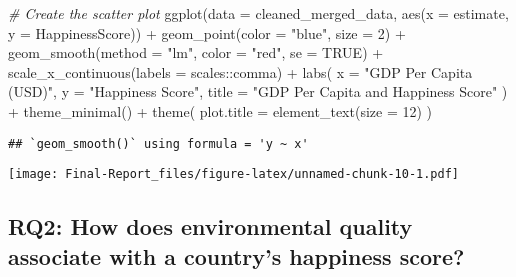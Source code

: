 \documentclass[
]{article}
\newenvironment{Shaded}{\begin{snugshade}}{\end{snugshade}}
\newcommand{\AttributeTok}[1]{\textcolor[rgb]{0.77,0.63,0.00}{#1}}
\newcommand{\CommentTok}[1]{\textcolor[rgb]{0.56,0.35,0.01}{\textit{#1}}}
\newcommand{\ConstantTok}[1]{\textcolor[rgb]{0.00,0.00,0.00}{#1}}
\newcommand{\DecValTok}[1]{\textcolor[rgb]{0.00,0.00,0.81}{#1}}
\newcommand{\FunctionTok}[1]{\textcolor[rgb]{0.00,0.00,0.00}{#1}}
\newcommand{\NormalTok}[1]{#1}
\newcommand{\SpecialCharTok}[1]{\textcolor[rgb]{0.00,0.00,0.00}{#1}}
\newcommand{\StringTok}[1]{\textcolor[rgb]{0.31,0.60,0.02}{#1}}
\begin{document}
\begin{Shaded}
\begin{Highlighting}[]
\CommentTok{\# Create the scatter plot}
\FunctionTok{ggplot}\NormalTok{(}\AttributeTok{data =}\NormalTok{ cleaned\_merged\_data, }\FunctionTok{aes}\NormalTok{(}\AttributeTok{x =}\NormalTok{ estimate, }\AttributeTok{y =}\NormalTok{ HappinessScore)) }\SpecialCharTok{+}
    \FunctionTok{geom\_point}\NormalTok{(}\AttributeTok{color =} \StringTok{"blue"}\NormalTok{, }\AttributeTok{size =} \DecValTok{2}\NormalTok{) }\SpecialCharTok{+}                
    \FunctionTok{geom\_smooth}\NormalTok{(}\AttributeTok{method =} \StringTok{"lm"}\NormalTok{, }\AttributeTok{color =} \StringTok{"red"}\NormalTok{, }\AttributeTok{se =} \ConstantTok{TRUE}\NormalTok{) }\SpecialCharTok{+} 
    \FunctionTok{scale\_x\_continuous}\NormalTok{(}\AttributeTok{labels =}\NormalTok{ scales}\SpecialCharTok{::}\NormalTok{comma) }\SpecialCharTok{+}          
    \FunctionTok{labs}\NormalTok{(}
        \AttributeTok{x =} \StringTok{"GDP Per Capita (USD)"}\NormalTok{,}
        \AttributeTok{y =} \StringTok{"Happiness Score"}\NormalTok{,}
        \AttributeTok{title =} \StringTok{"GDP Per Capita and Happiness Score"}
\NormalTok{    ) }\SpecialCharTok{+}
  \FunctionTok{theme\_minimal}\NormalTok{() }\SpecialCharTok{+} 
  \FunctionTok{theme}\NormalTok{(}
    \AttributeTok{plot.title =} \FunctionTok{element\_text}\NormalTok{(}\AttributeTok{size =} \DecValTok{12}\NormalTok{) }
\NormalTok{  )}
\end{Highlighting}
\end{Shaded}

\begin{verbatim}
## `geom_smooth()` using formula = 'y ~ x'
\end{verbatim}

\texttt{[image: Final-Report\_files/figure-latex/unnamed-chunk-10-1.pdf]}

\hypertarget{rq2-how-does-environmental-quality-associate-with-a-countrys-happiness-score}{%
\subsection{RQ2: How does environmental quality associate with a
country's happiness
score?}\label{rq2-how-does-environmental-quality-associate-with-a-countrys-happiness-score}}
\end{document}
